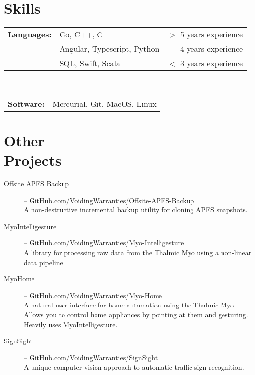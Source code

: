 \documentclass[margin]{res}
\begin{document}
\begin{minipage}{\textwidth}
\begin{resume}
\section{Skills}
\begin{tabular}{l l r}
		{\bf Languages:} & Go, C++, C & $>$ 5 years experience \\
		                 & Angular, Typescript, Python & 4 years experience \\
		                 & SQL, Swift, Scala & $<$ 3 years experience \\
\end{tabular} \\
\bgroup
\def\arraystretch{1.23} %
\begin{tabular}{l p{4in}}
		{\bf Software:} & Mercurial, Git, MacOS, Linux \\
 \end{tabular}
\egroup

\section{Other \\ Projects}
\begin{description}
	\item[Offsite APFS Backup] -- \uline{\href{https://GitHub.com/VoidingWarranties/offsite-apfs-backup}{GitHub.com/VoidingWarranties/Offsite-APFS-Backup}} \\
		A non-destructive incremental backup utility for cloning APFS snapshots.
	\item[MyoIntelligesture] -- \uline{\href{http://GitHub.com/VoidingWarranties/Myo-Intelligesture}{GitHub.com/VoidingWarranties/Myo-Intelligesture}} \\
		A library for processing raw data from the Thalmic Myo using a non-linear data pipeline.
	\item[MyoHome] -- \uline{\href{http://GitHub.com/VoidingWarranties/Myo-Home}{GitHub.com/VoidingWarranties/Myo-Home}} \\
		A natural user interface for home automation using the Thalmic Myo. Allows you to control home appliances by pointing at them and gesturing. Heavily uses MyoIntelligesture.
	\item[SignSight] -- \uline{\href{http://GitHub.com/VoidingWarranties/SignSight}{GitHub.com/VoidingWarranties/SignSight}} \\
		A unique computer vision approach to automatic traffic sign recognition.
\end{description}

\end{resume}
\end{minipage}
\end{document}
